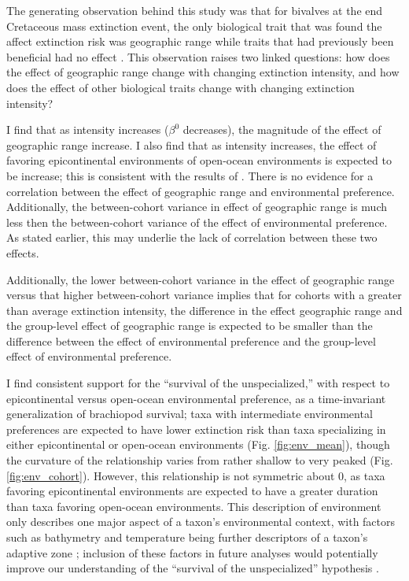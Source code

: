 \documentclass{article}
\begin{document}
The generating observation behind this study was that for bivalves at the end Cretaceous mass extinction event, the only biological trait that was found the affect extinction risk was geographic range while traits that had previously been beneficial had no effect \citep{Jablonski1986}. This observation raises two linked questions: how does the effect of geographic range change with changing extinction intensity, and how does the effect of other biological traits change with changing extinction intensity?

I find that as intensity increases (\(\beta^{0}\) decreases), the magnitude of the effect of geographic range increase. I also find that as intensity increases, the effect of favoring epicontinental environments of open-ocean environments is expected to be increase; this is consistent with the results of \citet{Miller2009a}. There is no evidence for a correlation between the effect of geographic range and environmental preference. Additionally, the between-cohort variance in effect of geographic range is much less then the between-cohort variance of the effect of environmental preference. As stated earlier, this may underlie the lack of correlation between these two effects.

Additionally, the lower between-cohort variance in the effect of geographic range versus that higher between-cohort variance implies that for cohorts with a greater than average extinction intensity, the difference in the effect geographic range and the group-level effect of geographic range is expected to be smaller than the difference between the effect of environmental preference and the group-level effect of environmental preference.

I find consistent support for the ``survival of the unspecialized,'' with respect to epicontinental versus open-ocean environmental preference, as a time-invariant generalization of brachiopod survival; taxa with intermediate environmental preferences are expected to have lower extinction risk than taxa specializing in either epicontinental or open-ocean environments (Fig. \ref{fig:env_mean}), though the curvature of the relationship varies from rather shallow to very peaked (Fig. \ref{fig:env_cohort}). However, this relationship is not symmetric about 0, as taxa favoring epicontinental environments are expected to have a greater duration than taxa favoring open-ocean environments. This description of environment only describes one major aspect of a taxon's environmental context, with factors such as bathymetry and temperature being further descriptors of a taxon's adaptive zone \citep{Nurnberg2013a,Harnik2013,Harnik2011,Heim2011}; inclusion of these factors in future analyses would potentially improve our understanding of the ``survival of the unspecialized'' hypothesis \citep{Simpson1944}.
\end{document}
